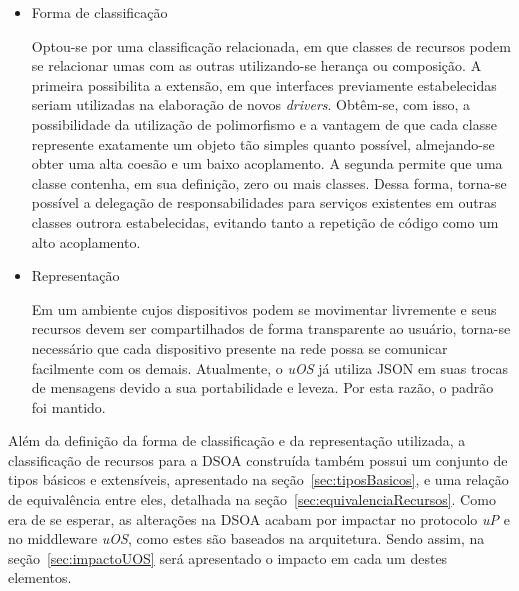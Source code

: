 \begin{itemize}
	\item Forma de classificação

	Optou-se por uma classificação relacionada, em que classes de recursos podem se relacionar umas com as outras utilizando-se herança ou composição. A primeira possibilita a extensão, em que interfaces previamente estabelecidas seriam utilizadas na elaboração de novos \emph{drivers}. Obtêm-se, com isso, a possibilidade da utilização de polimorfismo e a vantagem de que cada classe represente exatamente um objeto tão simples quanto possível, almejando-se obter uma alta coesão e um baixo acoplamento. A segunda permite que uma classe contenha, em sua definição, zero ou mais classes. Dessa forma, torna-se possível a delegação de responsabilidades para serviços existentes em outras classes outrora estabelecidas, evitando tanto a repetição de código como um alto acoplamento.

	\item Representação

	Em um ambiente cujos dispositivos podem se movimentar livremente e seus recursos devem ser compartilhados de forma transparente ao usuário, torna-se necessário que cada dispositivo presente na rede possa se comunicar facilmente com os demais. Atualmente, o \emph{uOS} já utiliza JSON em suas trocas de mensagens devido a sua portabilidade e leveza. Por esta razão, o padrão foi mantido.

	\begin{comment}
	Tal formato apresenta as seguintes características:
	
		\begin{itemize}
	 		\item Baixo custo computacional~\cite{comparativojson};
	 		\item É auto-descritivo, o que facilita os processos de leitura e escrita por seres-humanos~\cite{json};
	 		\item É estruturado, o que facilita sua criação e análise por computadores~\cite{json};
	 		\item É independente de plataforma, pois utiliza UTF-8 como codificação~\cite{utf8}.
	 	\end{itemize}
	 \end{comment}
\end{itemize}

Além da definição da forma de classificação e da representação utilizada, a classificação de recursos para a DSOA construída também possui um conjunto de tipos básicos e extensíveis, apresentado na seção~\ref{sec:tiposBasicos}, e uma relação de equivalência entre eles, detalhada na seção~\ref{sec:equivalenciaRecursos}. Como era de se esperar, as alterações na DSOA acabam por impactar no protocolo \emph{uP} e no middleware \emph{uOS}, como estes são baseados na arquitetura. Sendo assim, na seção~\ref{sec:impactoUOS} será apresentado o impacto em cada um destes elementos.

